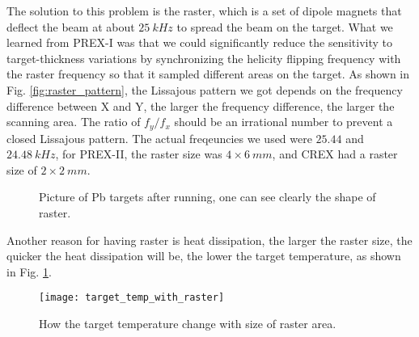 The solution to this problem is the raster, which is a set of dipole magnets %
that deflect the beam at about $25\ kHz$ to spread the beam on the target.
What we learned from PREX-I was that we could significantly reduce the sensitivity 
to target-thickness variations by synchronizing the helicity flipping frequency
with the raster frequency so that it sampled different areas on the target. 
As shown in Fig. \ref{fig:raster_pattern}, the Lissajous pattern we got depends
on the frequency difference between X and Y, the larger the frequency difference,
the larger the scanning area. The ratio of $f_y/f_x$ should be an irrational number
to prevent a closed Lissajous pattern. The actual freqeuncies we used were $25.44$
and $24.48\ kHz$, for PREX-II, the raster size was $4 \times 6\ mm$, and CREX
had a raster size of $2 \times 2\ mm$.

\begin{figure}
    \caption{Picture of Pb targets after running, one can see clearly the shape
    of raster.}
\end{figure}

Another reason for having raster is heat dissipation, the larger the raster size,
the quicker the heat dissipation will be, the lower the target temperature, as
shown in Fig. \ref{fig:target_temp_with_raster}.
\begin{figure}
    \centering
    \texttt{[image: target\_temp\_with\_raster]}
    \caption{How the target temperature change with size of raster area.}
    \label{fig:target_temp_with_raster}
\end{figure}

